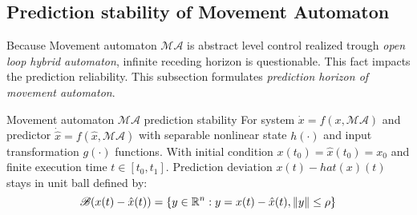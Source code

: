 \subsection{Prediction stability of Movement Automaton}\label{s:maConvergence}
\noindent Because Movement automaton $\mathscr{MA}$ is abstract level control realized trough \textit{open loop hybrid automaton}, infinite receding horizon is questionable. This fact impacts the prediction reliability. This subsection formulates \textit{prediction horizon of movement automaton}.

\begin{definition}{Movement automaton $\mathscr{MA}$ prediction stability}\label{def:maPredictionStability}
For system $\dot{x}=f(x,\mathscr{MA})$ and predictor $\dot{\hat{x}}=f(\hat{x},\mathscr{MA})$ with separable nonlinear state $h(\cdot)$ and input transformation $g(\cdot)$ functions. With initial condition $x(t_0)=\hat{x}(t_0)=x_0$ and finite execution time $t\in[t_0,t_1]$. Prediction deviation $x(t)-hat(x)(t)$ stays in unit ball defined by:
\begin{equation}
    \mathscr{B}(x(t)-\hat{x}(t))= \left\{y\in\mathbb{R}^n:y=x(t)-\hat{x}(t),\left\lVert y\right\rVert\le\rho\right\}
\end{equation}
\end{definition}

